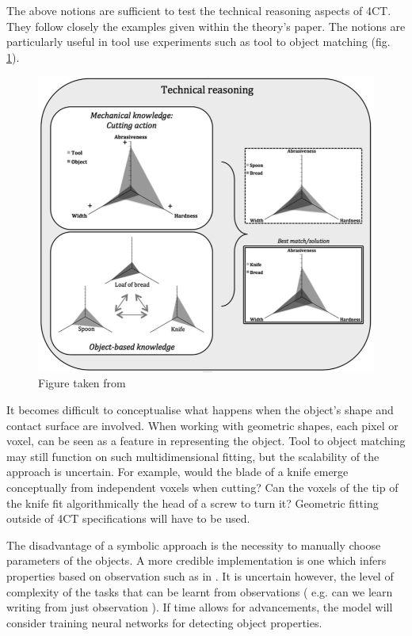 \documentclass[11]{article}
\begin{document}
The above notions are sufficient to test the technical reasoning aspects of 4CT. They follow closely the examples given within the theory's paper. The notions are particularly useful in tool use experiments such as tool to object matching (fig. \ref{fig:knife}).

\begin{figure}[h]
	\label{fig:knife}
	\centering
	\includegraphics[width=1\textwidth]{knife.png}
	\caption { Figure taken from \cite{osiurak2014} }
\end{figure}

It becomes difficult to conceptualise what happens when the object's shape and contact surface are involved. When working with geometric shapes, each pixel or voxel, can be seen as a feature in representing the object. Tool to object matching may still function on such multidimensional fitting, but the scalability of the approach is uncertain. For example, would the blade of a knife emerge conceptually from independent voxels  when cutting? Can the voxels of the tip of the knife fit algorithmically the head of a screw to turn it? Geometric fitting outside of 4CT specifications will have to be used.

The disadvantage of a symbolic approach is the necessity to manually choose parameters of the objects. A more credible implementation is one which infers properties based on observation such as in \cite{zhu2015}. It is uncertain however, the level of complexity of the tasks that can be learnt from observations ( e.g. can we learn writing from just observation ). If time allows for advancements, the  model will consider training neural networks for detecting object properties.
\end{document}

